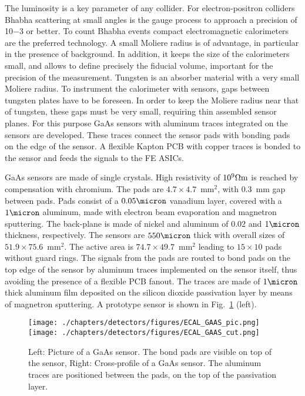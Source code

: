 The luminosity is a key parameter of any collider. For electron-positron colliders Bhabha scattering at small angles is the gauge process to approach a precision
of 10${-3}$ or better. To count Bhabha events compact electromagnetic calorimeters are the preferred technology. A small Moliere radius is of advantage, in particular in the presence of background. In addition, it keeps the size of the calorimeters small, and allows to define precisely the fiducial volume, important for the precision of the measurement. Tungsten is an absorber material with a very small Moliere radius. To instrument the calorimeter with sensors, gaps between tungsten plates have to be foreseen. In order to keep the Moliere radius near that of tungsten, these gaps must be very small, requiring thin assembled sensor planes. For this purpose GaAs sensors with aluminum traces integrated on the sensors are developed. These traces connect the sensor pads with bonding pads on the edge of the sensor. A flexible Kapton PCB with copper traces is bonded to the sensor and feeds the signals to the FE ASICs.     

GaAs sensors are made of single crystals. High resistivity of $10^9 \Omega {\rm m}$ is reached by compensation with chromium. The pads are $4.7 \times 4.7$~mm$^2$, with $0.3$~mm gap between pads. Pads consist of a $0.05 \micron$ vanadium layer, covered with a $1 \micron$ aluminum, made with electron beam evaporation and magnetron sputtering. The back-plane is made of nickel and aluminum of $0.02$ and $1 \micron$ thickness, respectively. 
The sensors are $550 \micron$ thick with overall sizes of $51.9 \times 75.6$~mm$^2$.  The active area is $74.7 \times 49.7$~mm$^2$ leading to $15\times 10$ pads without guard rings. 
The signals from the pads are routed to bond pads on the top edge of the sensor      
by aluminum traces implemented on the sensor itself, thus avoiding the presence of a flexible PCB fanout.
The traces are made of $1 \micron$ thick aluminum film deposited on the silicon dioxide passivation layer by means of magnetron sputtering. 
A prototype sensor is shown in Fig.~\ref{ECAL_GAAS_pic} (left).
\begin{figure}[htb]
\begin{center}
    \texttt{[image: ./chapters/detectors/figures/ECAL\_GAAS\_pic.png]}
    \hfill
    \texttt{[image: ./chapters/detectors/figures/ECAL\_GAAS\_cut.png]}
    \caption{Left: Picture of a GaAs sensor. The bond pads are visible on top of the sensor, Right: Cross-profile of a GaAs sensor. The aluminum traces are positioned between the pads, on the top of the passivation layer.}
    \label{ECAL_GAAS_pic}
  \hspace{0.025\textwidth}
  \end{center}
\end{figure}

